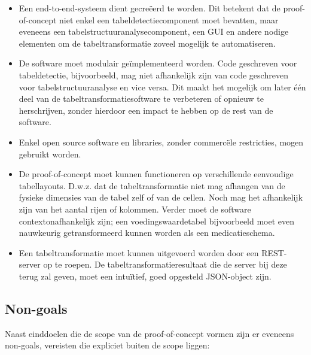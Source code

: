 \begin{itemize}
    \item Een end-to-end-systeem dient gecreëerd te worden. Dit betekent dat de proof-of-concept niet enkel een tabeldetectiecomponent moet bevatten, maar eveneens een tabelstructuuranalysecomponent, een GUI en andere nodige elementen om de tabeltransformatie zoveel mogelijk te automatiseren.\\

    \item De software moet modulair geïmplementeerd worden. Code geschreven voor tabeldetectie, bijvoorbeeld, mag niet afhankelijk zijn van code geschreven voor tabelstructuuranalyse en vice versa. Dit maakt het mogelijk om later één deel van de tabeltransformatiesoftware te verbeteren of opnieuw te herschrijven, zonder hierdoor een impact te hebben op de rest van de software.\\

    \item Enkel open source software en libraries, zonder commercële restricties, mogen gebruikt worden.\\

    \item De proof-of-concept moet kunnen functioneren op verschillende eenvoudige tabellayouts. D.w.z. dat de tabeltransformatie niet mag afhangen van de fysieke dimensies van de tabel zelf of van de cellen. Noch mag het afhankelijk zijn van het aantal rijen of kolommen. Verder moet de software contextonafhankelijk zijn; een voedingswaardetabel bijvoorbeeld moet even nauwkeurig getransformeerd kunnen worden als een medicatieschema.\\

    \item Een tabeltransformatie moet kunnen uitgevoerd worden door een \Gls{REST}-server op te roepen. De tabeltransformatieresultaat die de server bij deze terug zal geven, moet een intuïtief, goed opgesteld \Gls{JSON}-object zijn.
\end{itemize}

\subsection{Non-goals}

Naast einddoelen die de scope van de proof-of-concept vormen zijn er eveneens non-goals, vereisten die expliciet buiten de scope liggen:

